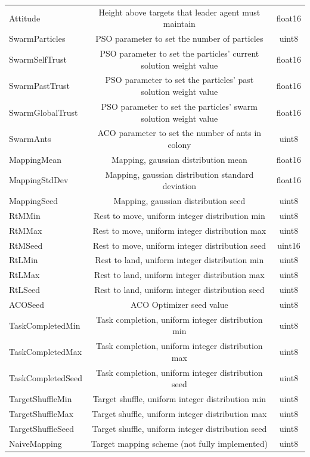 \documentclass{report}
\begin{document}
\begin{appendices}
\begin{table}
\begin{center}
\begin{tabular}{|l|c|c|}
		Attitude & Height above targets that leader agent must maintain & float16 \\
		SwarmParticles & PSO parameter to set the number of particles & uint8 \\
		SwarmSelfTrust & PSO parameter to set the particles' current solution weight value & float16 \\
		SwarmPastTrust & PSO parameter to set the particles' past solution weight value & float16 \\
		SwarmGlobalTrust & PSO parameter to set the particles' swarm solution weight value & float16 \\
		SwarmAnts & ACO parameter to set the number of ants in colony & uint8 \\
		MappingMean & Mapping, gaussian distribution mean & float16 \\
		MappingStdDev & Mapping, gaussian distribution standard deviation & float16 \\
		MappingSeed & Mapping, gaussian distribution seed & uint8 \\
		RtMMin & Rest to move, uniform integer distribution min & uint8 \\
		RtMMax & Rest to move, uniform integer distribution max & uint8 \\
		RtMSeed & Rest to move, uniform integer distribution seed & uint16 \\
		RtLMin & Rest to land, uniform integer distribution min & uint8 \\
		RtLMax & Rest to land, uniform integer distribution max & uint8 \\
		RtLSeed & Rest to land, uniform integer distribution seed & uint8 \\
		ACOSeed & ACO Optimizer seed value & uint8 \\
		TaskCompletedMin & Task completion, uniform integer distribution min & uint8 \\
		TaskCompletedMax & Task completion, uniform integer distribution max & uint8 \\
		TaskCompletedSeed & Task completion, uniform integer distribution seed & uint8 \\
		TargetShuffleMin & Target shuffle, uniform integer distribution min & uint8 \\
		TargetShuffleMax & Target shuffle, uniform integer distribution max & uint8 \\
		TargetShuffleSeed & Target shuffle, uniform integer distribution seed & uint8 \\
		NaiveMapping & Target mapping scheme (not fully implemented) & uint8 \\

\end{tabular}
\end{center}
\end{table}
\end{appendices}
\end{document}
